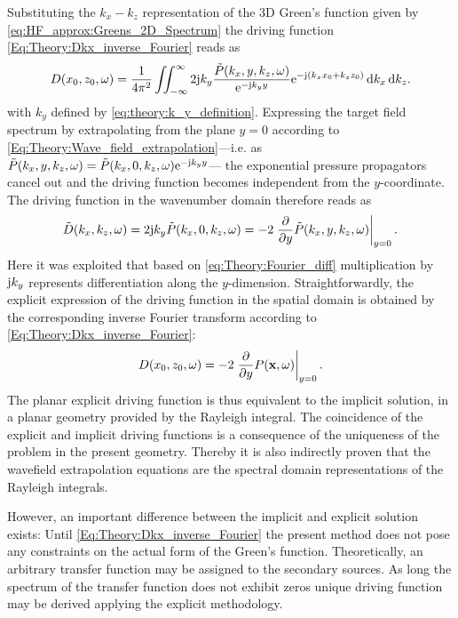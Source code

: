 Substituting the $k_x-k_z$ representation of the 3D Green's function given by \eqref{eq:HF_approx:Greens_2D_Spectrum} the driving function \eqref{Eq:Theory:Dkx_inverse_Fourier} reads as
\begin{equation}
D(x_0,z_0,\omega) = \frac{1}{4\pi^2} \iint_{-\infty}^{\infty} 2\mathrm{j} k_y \frac{\tilde{P}(k_x,y,k_z, \omega)}{ \mathrm{e}^{ -\mathrm{j} k_y  y  } } \mathrm{e}^{-\mathrm{j} (k_x x_0 + k_z z_0)} \, \mathrm{d} k_x \, \mathrm{d} k_z.
\end{equation}
with $k_y$ defined by \eqref{eq:theory:k_y_definition}.	
Expressing the target field spectrum by extrapolating from the plane $y = 0$ according to \eqref{Eq:Theory:Wave_field_extrapolation}---i.e. as 
$
\tilde{P}(k_x,y,k_z, \omega) = \tilde{P}(k_x,0,k_z, \omega)  \mathrm{e}^{ -\mathrm{j} k_y  y }
$---
the exponential pressure propagators cancel out and the driving function becomes independent from the $y$-coordinate. 
The driving function in the wavenumber domain therefore reads as
\begin{equation}
\tilde{D}(k_x,k_z,\omega) = 2\mathrm{j} k_y \tilde{P}(k_x,0,k_z,\omega) = -2 \left. \frac{\partial}{\partial y} \tilde{P}(k_x,y,k_z,\omega) \right|_{y = 0}.
\label{Eq:Theory:Planar_explicit_driv_fun}
\end{equation}
Here it was exploited that based on \eqref{eq:Theory:Fourier_diff} multiplication by $\mathrm{j} k_y$ represents differentiation along the $y$-dimension.
Straightforwardly, the explicit expression of the driving function in the spatial domain is obtained by the corresponding inverse Fourier transform according to \eqref{Eq:Theory:Dkx_inverse_Fourier}:
\begin{equation}
D(x_0,z_0,\omega) = -2 \left. \frac{\partial}{\partial y} P(\mathbf{x},\omega) \right|_{y = 0}.
\label{Eq:Theory:Planar_explicit_driv_fun_spatial}
\end{equation}
The planar explicit driving function is thus equivalent to the implicit solution, in a planar geometry provided by the Rayleigh integral.
The coincidence of the explicit and implicit driving functions is a consequence of the uniqueness of the problem in the present geometry.
Thereby it is also indirectly proven that the wavefield extrapolation equations are the spectral domain representations of the Rayleigh integrals.

However, an important difference between the implicit and explicit solution exists: 
Until \eqref{Eq:Theory:Dkx_inverse_Fourier} the present method does not pose any constraints on the actual form of the Green's function. 
Theoretically, an arbitrary transfer function may be assigned to the secondary sources.
As long the spectrum of the transfer function does not exhibit zeros unique driving function may be derived applying the explicit methodology.

